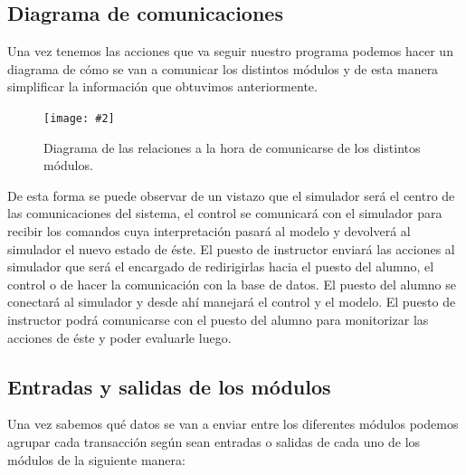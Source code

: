 \documentclass[12pt,a4paper,spanish]{book} %
\newcommand{\imgCentradaGrande}[3]{
\begin{figure}[H]
\begin{center}
\texttt{[image: \#2]}
\caption{#3}
\label{#1}
\end{center}
\end{figure}
}
\begin{document}
\subsection{Diagrama de comunicaciones}

Una vez tenemos las acciones que va seguir nuestro programa podemos hacer un diagrama de cómo se van a comunicar los distintos módulos y de esta manera simplificar la información que obtuvimos anteriormente.

\imgCentradaGrande{fig.4.7}{img/relacionescomunicacion.eps}{Diagrama de las relaciones a la hora de comunicarse de los distintos módulos.}

De esta forma se puede observar de un vistazo que el simulador será el centro de las comunicaciones del sistema, el control se comunicará con el simulador para recibir los comandos cuya interpretación pasará al modelo y devolverá al simulador el nuevo estado de éste. El puesto de instructor enviará las acciones al simulador que será el encargado de redirigirlas hacia el puesto del alumno, el control o de hacer la comunicación con la base de datos. El puesto del alumno se conectará al simulador y desde ahí manejará el control y el modelo. El puesto de instructor podrá comunicarse con el puesto del alumno para monitorizar las acciones de éste y poder evaluarle luego.

\newpage
\subsection{Entradas y salidas de los módulos}

Una vez sabemos qué datos se van a enviar entre los diferentes módulos podemos agrupar cada transacción según sean entradas o salidas de cada uno de los módulos de la siguiente manera:
\end{document}
